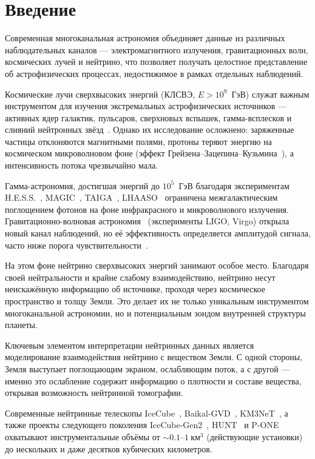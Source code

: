 \section{Введение}

Современная многоканальная астрономия объединяет данные из различных наблюдательных каналов — электромагнитного излучения, гравитационных волн, космических лучей и нейтрино, что позволяет получать целостное представление об астрофизических процессах, недостижимое в рамках отдельных наблюдений.

Космические лучи сверхвысоких энергий (КЛСВЭ, $E > 10^9$~ГэВ) служат важным инструментом для изучения экстремальных астрофизических источников — активных ядер галактик, пульсаров, сверхновых вспышек, гамма-всплесков и слияний нейтронных звёзд~\cite{auger2020anisotropy, auger2020spectrum, kotera2011astrophysics, kimura2017ultrahigh}.  
Однако их исследование осложнено: заряженные частицы отклоняются магнитными полями, протоны теряют энергию на космическом микроволновом фоне (эффект Грейзена–Зацепина–Кузьмина~\cite{greisen1966}), а интенсивность потока чрезвычайно мала.  

Гамма-астрономия, достигшая энергий до $10^5$~ГэВ благодаря экспериментам H.E.S.S.~\cite{hess2021}, MAGIC~\cite{hessandmagic2021}, TAIGA~\cite{Elshoukrofy:2023My}, LHAASO~\cite{LHAASO2021_UHEgamma,Zhao2023_LHAASO_PeVdiffuse} ограничена межгалактическим поглощением фотонов на фоне инфракрасного и микроволнового излучения.  
Гравитационно-волновая астрономия~\cite{virgoandligo2016, Abbott:2017, Fan:2024} (эксперименты LIGO, Virgo) открыла новый канал наблюдений, но её эффективность определяется амплитудой сигнала, часто ниже порога чувствительности~\cite{Isaacson1968, LIGOScientific:2018Sens}.  

На этом фоне нейтрино сверхвысоких энергий занимают особое место. Благодаря своей нейтральности и крайне слабому взаимодействию, нейтрино несут неискажённую информацию об источнике, проходя через космическое пространство и толщу Земли. Это делает их не только уникальным инструментом многоканальной астрономии, но и потенциальным зондом внутренней структуры планеты.

Ключевым элементом интерпретации нейтринных данных является моделирование взаимодействия нейтрино с веществом Земли. С одной стороны, Земля выступает поглощающим экраном, ослабляющим поток, а с другой — именно это ослабление содержит информацию о плотности и составе вещества, открывая возможность нейтринной томографии.

Современные нейтринные телескопы IceCube~\cite{IceCube_JINST2017}, Baikal-GVD~\cite{BaikalGVD_2021_status}, KM3NeT~\cite{KM3NeT_LOI2016}, а также проекты следующего поколения IceCube-Gen2~\cite{IceCubeGen2_WhitePaper2020}, HUNT~\cite{HUNT_ICRC2023} и P-ONE~\cite{PONE_WhitePaper2020} охватывают инструментальные объёмы от $\sim0.1$–$1~\text{км}^3$ (действующие установки) до нескольких и даже десятков кубических километров.

